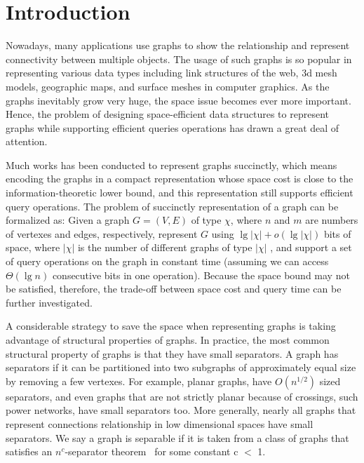 \documentclass[12pt,glossary]{dalthesis}
\begin{document}
\mainmatter

\chapter{Introduction}

Nowadays, many applications use graphs to show the relationship and represent connectivity between multiple objects. The usage of such graphs is so popular in representing various data types including link structures of the web, 3d mesh models, geographic maps, and surface meshes in computer graphics. As the graphs inevitably grow very huge, the space issue becomes ever more important. Hence, the problem of designing space-efficient data structures to represent graphs while supporting efficient queries operations has drawn a great deal of attention. 

\bigskip
Much works has been conducted to represent graphs succinctly, which means encoding the graphs in a compact representation whose space cost is close to the information-theoretic lower bound, and this representation still supports efficient query operations. The problem of succinctly representation of a graph can be formalized as: Given a graph $G = (V, E)$ of type $\chi$, where $n$ and $m$ are numbers of vertexes and edges, respectively, represent $G$ using $\lg | \chi | + o(\lg | \chi | )$ bits of space, where $|\chi|$ is the number of different graphs of type $|\chi|$ , and support a set of query operations on the graph in constant time (assuming we can access $\Theta(\lg n)$ consecutive bits in one operation). Because the space bound may not be satisfied, therefore, the trade-off between space cost and query time can be further investigated.  

\bigskip


A considerable strategy to save the space when representing graphs is taking advantage of structural properties of graphs. In practice, the most common structural property of graphs is that they have small separators. A graph has separators if it can be partitioned into two subgraphs of approximately equal size by removing a few vertexes. For example, planar graphs, have $O(n^{1/2})$ sized separators, and even graphs that are not strictly planar because of crossings, such power networks, have small separators too. More generally, nearly all graphs that represent connections relationship in low dimensional spaces have small separators. We say a graph is separable if it is taken from a class of graphs that satisfies an $n^{c}$-separator theorem~\cite{separator-theorem} for some constant c $<$ 1.
\end{document}
